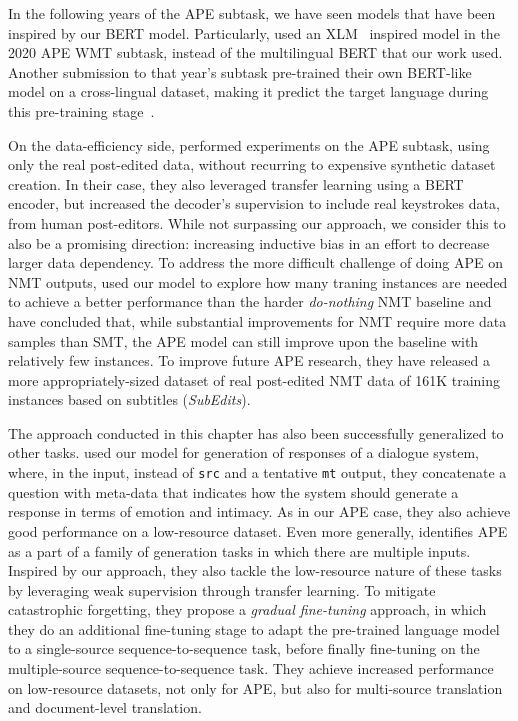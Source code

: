 In the following years of the APE subtask, we have seen models that
have been inspired by our BERT model. Particularly,
\citet{lee2020POSTECHETRISubmissionWMT2020} used an
XLM~\citep{lample2019xlm} inspired model in the 2020 APE WMT subtask,
instead of the multilingual BERT that our work used. Another
submission to that year's subtask pre-trained their own BERT-like
model on a cross-lingual dataset, making it predict the target
language during this pre-training
stage~\citep{wang2020AlibabaSubmissionWMT}.

On the data-efficiency side,
\citet{gois2020LearningNonMonotonicAutomatic} performed
experiments on the APE subtask, using only the real post-edited data,
without recurring to expensive synthetic dataset creation. In their
case, they also leveraged transfer learning using a BERT encoder, but
increased the decoder's supervision to include real keystrokes data,
from human post-editors. While not surpassing our approach, we
consider this to also be a promising direction: increasing inductive
bias in an effort to decrease larger data dependency. To address the
more difficult challenge of doing APE on NMT outputs,
\citet{chollampatt2020CanAutomaticPostEditing} used our model to
explore how many traning instances are needed to achieve a better
performance than the harder \emph{do-nothing} NMT baseline and have
concluded that, while substantial improvements for NMT require more
data samples than SMT, the APE model can still improve upon the
baseline with relatively few instances. To improve future
APE research, they have released a more appropriately-sized dataset
of real post-edited NMT data of 161K training instances based on
subtitles (\emph{SubEdits}).

The approach conducted in this chapter has also been successfully
generalized to other tasks. \citet{kodama2020GeneratingResponsesthat}
used our model for generation of responses of a dialogue system,
where, in the input, instead of \texttt{src} and a tentative
\texttt{mt} output, they concatenate a question with meta-data that
indicates how the system should generate a response in terms of
emotion and intimacy. As in our APE case, they also achieve good
performance on a low-resource dataset. Even more generally,
\citet{huang2021TransferLearningSequence} identifies APE as a part of
a family of generation tasks in which there are multiple inputs.
Inspired by our approach, they also tackle the low-resource nature of
these tasks by leveraging weak supervision through transfer learning.
To mitigate catastrophic forgetting, they propose a \emph{gradual
    fine-tuning} approach, in which they do an additional fine-tuning
stage to adapt the pre-trained language model to a single-source
sequence-to-sequence task, before finally fine-tuning on the
multiple-source sequence-to-sequence task. They achieve increased
performance on low-resource datasets, not only for APE, but also for
multi-source translation and document-level translation.

